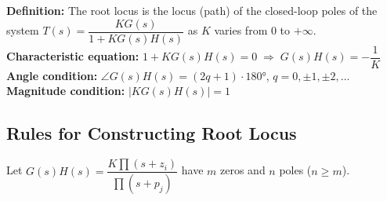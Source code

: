 \documentclass[12pt,a4paper]{article}
\begin{document}
\begin{tcolorbox}[defbox]
\textbf{Definition:} The root locus is the locus (path) of the closed-loop poles of the system $T(s) = \dfrac{KG(s)}{1+KG(s)H(s)}$ as $K$ varies from $0$ to $+\infty$.\\[4pt]
\textbf{Characteristic equation:} $1 + KG(s)H(s) = 0 \;\Rightarrow\; G(s)H(s) = -\dfrac{1}{K}$\\[4pt]
\textbf{Angle condition:} $\angle G(s)H(s) = (2q+1)\cdot 180°$, $q = 0,\pm1,\pm2,\ldots$\\[2pt]
\textbf{Magnitude condition:} $|KG(s)H(s)| = 1$
\end{tcolorbox}

\subsection{Rules for Constructing Root Locus}

Let $G(s)H(s) = \dfrac{K\prod(s+z_i)}{\prod(s+p_j)}$ have $m$ zeros and $n$ poles ($n \geq m$).
\end{document}

